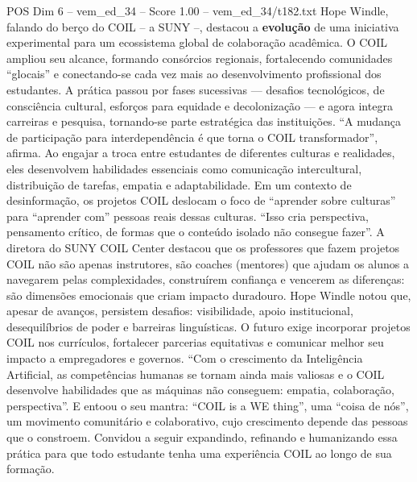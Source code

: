 \begin{textsample}{POS Dim 6 – vem\_ed\_34 – Score 1.00 – vem\_ed\_34/t182.txt}
Hope Windle, falando do berço do COIL – a SUNY –, destacou a \textbf{evolução} de uma iniciativa experimental para um ecossistema global de colaboração acadêmica.
O COIL ampliou seu alcance, formando consórcios regionais, fortalecendo comunidades “glocais” e conectando-se cada vez mais ao desenvolvimento profissional dos estudantes.
A prática passou por fases sucessivas — desafios tecnológicos, de consciência cultural, esforços para equidade e decolonização — e agora integra carreiras e pesquisa, tornando-se parte estratégica das instituições. “A mudança de participação para interdependência é que torna o COIL transformador”, afirma.
Ao engajar a troca entre estudantes de diferentes culturas e realidades, eles desenvolvem habilidades essenciais como comunicação intercultural, distribuição de tarefas, empatia e adaptabilidade.
Em um contexto de desinformação, os projetos COIL deslocam o foco de “aprender sobre culturas” para “aprender com” pessoas reais dessas culturas. “Isso cria perspectiva, pensamento crítico, de formas que o conteúdo isolado não consegue fazer”.
A diretora do SUNY COIL Center destacou que os professores que fazem projetos COIL não são apenas instrutores, são coaches (mentores) que ajudam os alunos a navegarem pelas complexidades, construírem confiança e vencerem as diferenças: são dimensões emocionais que criam impacto duradouro.
Hope Windle notou que, apesar de avanços, persistem desafios: visibilidade, apoio institucional, desequilíbrios de poder e barreiras linguísticas.
O futuro exige incorporar projetos COIL nos currículos, fortalecer parcerias equitativas e comunicar melhor seu impacto a empregadores e governos. “Com o crescimento da Inteligência Artificial, as competências humanas se tornam ainda mais valiosas e o COIL desenvolve habilidades que as máquinas não conseguem: empatia, colaboração, perspectiva”.
E entoou o seu mantra: “COIL is a WE thing”, uma “coisa de nós”, um movimento comunitário e colaborativo, cujo crescimento depende das pessoas que o constroem.
Convidou a seguir expandindo, refinando e humanizando essa prática para que todo estudante tenha uma experiência COIL ao longo de sua formação.

\end{textsample}
